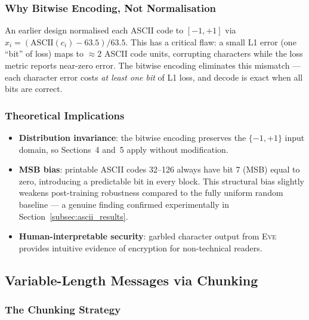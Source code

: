 \documentclass[12pt, a4paper]{article}
\newcommand{\eve}{\textsc{Eve}}
\begin{document}
\subsubsection*{Why Bitwise Encoding, Not Normalisation}

An earlier design normalised each ASCII code to $[-1,+1]$ via
$x_i = (\mathrm{ASCII}(c_i) - 63.5)/63.5$. This has a critical flaw:
a small L1 error (one ``bit'' of loss) maps to $\approx 2$ ASCII code
units, corrupting characters while the loss metric reports near-zero
error. The bitwise encoding eliminates this mismatch --- each character
error costs \emph{at least one bit} of L1 loss, and decode is exact
when all bits are correct.

\subsubsection*{Theoretical Implications}

\begin{itemize}[leftmargin=1.8em, itemsep=4pt]
  \item \textbf{Distribution invariance}: the bitwise encoding preserves
        the $\{-1,+1\}$ input domain, so Sections~4 and~5 apply without
        modification.
  \item \textbf{MSB bias}: printable ASCII codes 32--126 always have
        bit 7 (MSB) equal to zero, introducing a predictable bit in every
        block. This structural bias slightly weakens post-training
        robustness compared to the fully uniform random baseline --- a
        genuine finding confirmed experimentally in Section~\ref{subsec:ascii_results}.
  \item \textbf{Human-interpretable security}: garbled character output
        from \eve{} provides intuitive evidence of encryption for
        non-technical readers.
\end{itemize}
\subsection{Variable-Length Messages via Chunking}
\label{subsec:mode_variable}

\subsubsection*{The Chunking Strategy}
\end{document}
